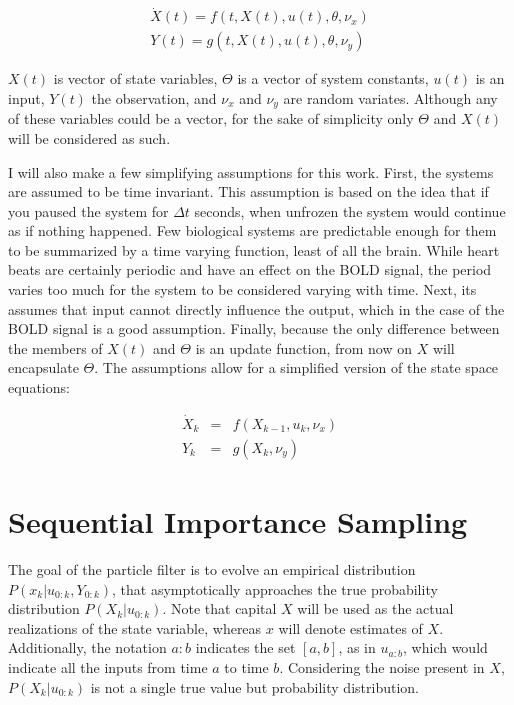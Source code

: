 \begin{eqnarray}
\dot{X}(t) = f(t, X(t), u(t), \theta, \nu_x) \nonumber \\
Y(t) = g(t, X(t), u(t), \theta, \nu_y)
\label{eq:GenericNonlinear}
\end{eqnarray}

$X(t)$ is vector of state variables, $\Theta$ is a vector of system
constants, $u(t)$ is an input, $Y(t)$ the observation, and
$\nu_x$ and $\nu_y$ are random variates. Although any of these
variables could be a vector, for the sake of simplicity only
$\Theta$ and $X(t)$ will be considered as such. 

I will also make a few  simplifying assumptions for this work. 
First, the systems are assumed to be 
time invariant. This 
assumption is based on the idea that if you paused the system for $\Delta t$
seconds, when unfrozen the system would continue as if nothing happened. 
Few biological systems are predictable enough for them to be summarized
by a time varying function, least of all the brain. While heart beats are certainly
periodic and have an effect on the BOLD signal, the period varies too much
for the system to be considered varying with time. 
Next, its assumes that input cannot directly
influence the output, which in the case of the BOLD signal is a good assumption.
Finally, because the only difference between the members of $X(t)$ and 
$\Theta$ is an update function, from now on $X$ will encapsulate
$\Theta$. The assumptions allow for a simplified version of the
state space equations:

\begin{eqnarray}
\dot{X}_k &=& f(X_{k-1}, u_k, \nu_x)
\label{eq:stateass}\\
Y_k &= &g(X_k, \nu_y)
\label{eq:measass}
\end{eqnarray}

\section{Sequential Importance Sampling}
The goal of the particle filter is to evolve an empirical distribution 
$P(x_k | u_{0:k}, Y_{0:k})$,
that asymptotically approaches the true probability distribution $P(X_k | u_{0:k})$.
Note that capital $X$ will be used as the actual realizations of 
the state variable, whereas $x$ will denote estimates of $X$.
Additionally, the notation $a:b$ indicates the set $[a,b]$,
as in $u_{a:b}$, which would indicate all the inputs from time $a$ to time $b$.
Considering the noise present in $X$,
 $P(X_k | u_{0:k})$ is not a single true value but probability distribution. 

